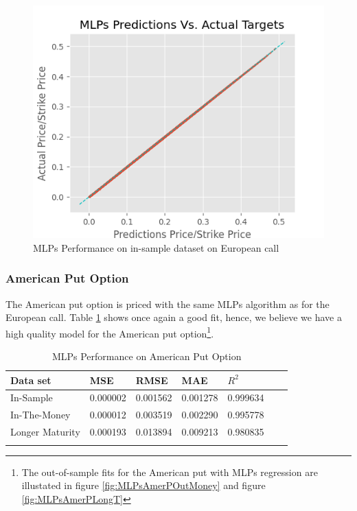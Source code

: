 \begin{figure}[th]
\centering
\includegraphics{Figures/PredictionEuroC.png}
\decoRule
\caption[MLPs Performance for In-sample Dataset European Call]{MLPs Performance on in-sample dataset on European call}
\label{fig:MLPsInSampleEuroC}
\end{figure}


\subsubsection{American Put Option}
The American put option is priced with the same MLPs algorithm as for the European call. Table \ref{tab:AmerPerformanceComparision} shows once again a good fit, hence, we believe we have a high quality model for the American put option\footnote{The out-of-sample fits for the American put with MLPs regression are illustated in figure \ref{fig:MLPsAmerPOutMoney} and figure \ref{fig:MLPsAmerPLongT}}.

\begin{table}[th]
\caption{MLPs Performance on American Put Option}
\label{tab:AmerPerformanceComparision}
\centering
\begin{tabular}{l l l l l l l }
\toprule
\textbf{Data set} & \textbf{MSE} & \textbf{RMSE} & \textbf{MAE} & \textbf{$R^2$} \\
\midrule
In-Sample & 0.000002 & 0.001562 & 0.001278 & 0.999634\\
In-The-Money & 0.000012 & 0.003519 & 0.002290 & 0.995778\\
Longer Maturity & 0.000193 & 0.013894 & 0.009213 & 0.980835\\
\bottomrule\\
\end{tabular}
\end{table}

